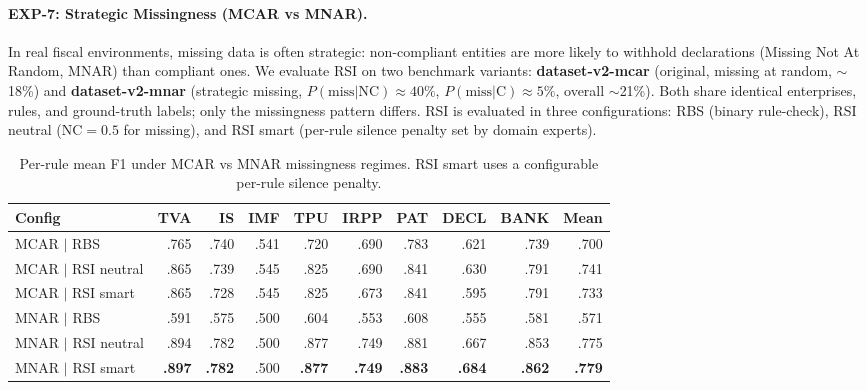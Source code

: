 \documentclass[letterpaper]{article}
\begin{document}
\paragraph{EXP-7: Strategic Missingness (MCAR vs MNAR).}

In real fiscal environments, missing data is often strategic:
non-compliant entities are more likely to withhold declarations
(Missing Not At Random, MNAR) than compliant ones. We evaluate RSI
on two benchmark variants: \textbf{dataset-v2-mcar} (original, missing
at random, $\sim$18\%) and \textbf{dataset-v2-mnar} (strategic missing,
$P(\text{miss}|\text{NC}) \approx 40\%$, $P(\text{miss}|\text{C})
\approx 5\%$, overall $\sim$21\%). Both share identical enterprises,
rules, and ground-truth labels; only the missingness pattern differs.
RSI is evaluated in three configurations: RBS (binary rule-check),
RSI neutral ($\mathrm{NC}=0.5$ for missing), and RSI smart
(per-rule silence penalty set by domain experts).

\begin{table}[H]
\centering
\caption{Per-rule mean F1 under MCAR vs MNAR missingness regimes.
         RSI smart uses a configurable per-rule silence penalty.}
\label{tab:mnar}
\renewcommand{\arraystretch}{1.2}
\begin{tabular}{l rrrrrrrr r}
\toprule
\textbf{Config}
  & \textbf{TVA} & \textbf{IS} & \textbf{IMF} & \textbf{TPU}
  & \textbf{IRPP} & \textbf{PAT} & \textbf{DECL} & \textbf{BANK}
  & \textbf{Mean} \\
\midrule
MCAR $|$ RBS         & .765 & .740 & .541 & .720 & .690 & .783 & .621 & .739 & .700 \\
MCAR $|$ RSI neutral & .865 & .739 & .545 & .825 & .690 & .841 & .630 & .791 & .741 \\
MCAR $|$ RSI smart   & .865 & .728 & .545 & .825 & .673 & .841 & .595 & .791 & .733 \\
\midrule
MNAR $|$ RBS         & .591 & .575 & .500 & .604 & .553 & .608 & .555 & .581 & .571 \\
MNAR $|$ RSI neutral & .894 & .782 & .500 & .877 & .749 & .881 & .667 & .853 & .775 \\
MNAR $|$ RSI smart   & \textbf{.897} & \textbf{.782} & .500 & \textbf{.877} & \textbf{.749} & \textbf{.883} & \textbf{.684} & \textbf{.862} & \textbf{.779} \\
\bottomrule
\end{tabular}
\end{table}
\end{document}
